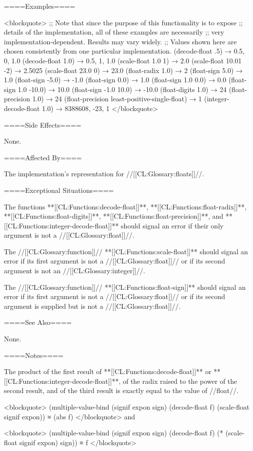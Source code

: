 ====Examples====

<blockquote> ;; Note that since the purpose of this functionality is to expose ;; details of the implementation, all of these examples are necessarily ;; very implementation-dependent. Results may vary widely. ;; Values shown here are chosen consistently from one particular implementation. (decode-float .5) → 0.5, 0, 1.0 (decode-float 1.0) → 0.5, 1, 1.0 (scale-float 1.0 1) → 2.0 (scale-float 10.01 -2) → 2.5025 (scale-float 23.0 0) → 23.0 (float-radix 1.0) → 2 (float-sign 5.0) → 1.0 (float-sign -5.0) → -1.0 (float-sign 0.0) → 1.0 (float-sign 1.0 0.0) → 0.0 (float-sign 1.0 -10.0) → 10.0 (float-sign -1.0 10.0) → -10.0 (float-digits 1.0) → 24 (float-precision 1.0) → 24 (float-precision least-positive-single-float) → 1 (integer-decode-float 1.0) → 8388608, -23, 1 </blockquote>

====Side Effects====

None.

====Affected By====

The implementation's representation for //[[CL:Glossary:floats]]//.

====Exceptional Situations====

The functions **[[CL:Functions:decode-float]]**, **[[CL:Functions:float-radix]]**, **[[CL:Functions:float-digits]]**, **[[CL:Functions:float-precision]]**, and **[[CL:Functions:integer-decode-float]]** should signal an error if their only argument is not a //[[CL:Glossary:float]]//.

The //[[CL:Glossary:function]]// **[[CL:Functions:scale-float]]** should signal an error if its first argument is not a //[[CL:Glossary:float]]// or if its second argument is not an //[[CL:Glossary:integer]]//.

The //[[CL:Glossary:function]]// **[[CL:Functions:float-sign]]** should signal an error if its first argument is not a //[[CL:Glossary:float]]// or if its second argument is supplied but is not a //[[CL:Glossary:float]]//.

====See Also====

None.

====Notes====

The product of the first result of **[[CL:Functions:decode-float]]** or **[[CL:Functions:integer-decode-float]]**, of the radix raised to the power of the second result, and of the third result is exactly equal to the value of //float//.

<blockquote> (multiple-value-bind (signif expon sign) (decode-float f) (scale-float signif expon)) ≡ (abs f) </blockquote> and

<blockquote> (multiple-value-bind (signif expon sign) (decode-float f) (* (scale-float signif expon) sign)) ≡ f </blockquote>

